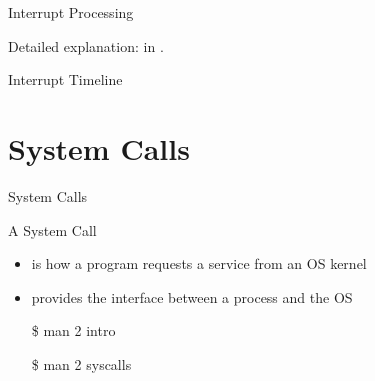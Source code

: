 \begin{frame}{Interrupt Processing}
  \begin{center}
  \end{center}
\end{frame}

Detailed explanation: in .

\begin{frame}{Interrupt Timeline}
  \begin{center}
  \end{center}
\end{frame}

\section{System Calls}
\label{sec:system-calls}


\begin{frame}{System Calls}
  \begin{block}{A System Call}
    \begin{itemize}
    \item is how a program requests a service from an OS kernel
    \item provides the interface between a process and the OS
    \end{itemize}
  \end{block}
  \ttfamily
  \begin{itemize}
  \item[\$] man 2 intro
  \item[\$] man 2 syscalls
  \end{itemize}
\end{frame}

\begin{frame}%
  \begin{center}
  \end{center}
\end{frame}

